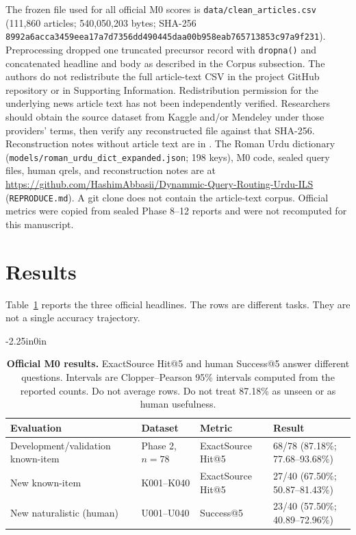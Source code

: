 \documentclass[10pt,letterpaper]{article}
\begin{document}
The frozen file used for all official M0 scores is \texttt{data/clean\_articles.csv} (111,860 articles; 540,050,203 bytes; SHA-256 \texttt{8992a6acca3459eea17a7d7356dd490445daa00b958eab765713853c97a9f231}). Preprocessing dropped one truncated precursor record with \texttt{dropna()} and concatenated headline and body as described in the Corpus subsection. The authors do not redistribute the full article-text CSV in the project GitHub repository or in Supporting Information. Redistribution permission for the underlying news article text has not been independently verified. Researchers should obtain the source dataset from Kaggle and/or Mendeley under those providers' terms, then verify any reconstructed file against that SHA-256. Reconstruction notes without article text are in . The Roman Urdu dictionary (\texttt{models/roman\_urdu\_dict\_expanded.json}; 198 keys), M0 code, sealed query files, human qrels, and reconstruction notes are at \url{https://github.com/HashimAbbasii/Dynammic-Query-Routing-Urdu-ILS} (\texttt{REPRODUCE.md}). A git clone does not contain the article-text corpus. Official metrics were copied from sealed Phase 8--12 reports and were not recomputed for this manuscript.

\section*{Results}
Table~\ref{table1} reports the three official headlines. The rows are different tasks. They are not a single accuracy trajectory.

\begin{adjustwidth}{-2.25in}{0in}
\begin{table}[!ht]
\centering
\caption{\textbf{Official M0 results.} ExactSource Hit@5 and human Success@5 answer different questions. Intervals are Clopper--Pearson 95\% intervals computed from the reported counts. Do not average rows. Do not treat 87.18\% as unseen or as human usefulness.}
\begin{tabular}{|p{4.2cm}|p{3.0cm}|p{3.2cm}|p{5.2cm}|}
\hline
\textbf{Evaluation} & \textbf{Dataset} & \textbf{Metric} & \textbf{Result} \\
\hline
Development/validation known-item & Phase 2, $n = 78$ & ExactSource Hit@5 & 68/78 (87.18\%; 77.68--93.68\%) \\
\hline
New known-item & K001--K040 & ExactSource Hit@5 & 27/40 (67.50\%; 50.87--81.43\%) \\
\hline
New naturalistic (human) & U001--U040 & Success@5 & 23/40 (57.50\%; 40.89--72.96\%) \\
\hline
\end{tabular}
\label{table1}
\end{table}
\end{adjustwidth}
\end{document}
